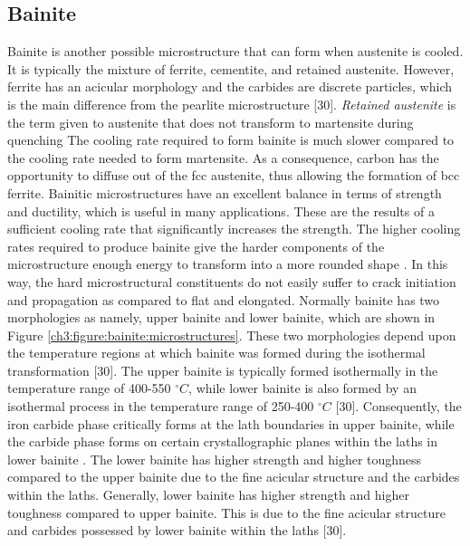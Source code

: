 \documentclass[12pt]{report}
\begin{document}
\subsection{Bainite}
Bainite is another possible microstructure that can form when austenite is cooled. It is typically the mixture of ferrite, cementite, and retained austenite. However, ferrite has an acicular morphology and the carbides are discrete particles, which is the main difference from the pearlite microstructure [30]. \emph{Retained austenite} is the term given to austenite that does not transform to martensite during quenching \cite{bajaj2020steels} The cooling rate required to form bainite is much slower compared to the cooling rate needed to form martensite. As a consequence, carbon has the opportunity to diffuse out of the fcc austenite, thus allowing the formation of bcc ferrite.  
Bainitic microstructures have an excellent balance in terms of strength and ductility, which is useful in many applications. These are the results of a sufficient cooling rate that significantly increases the strength. The higher cooling rates required to produce bainite give the harder components of the microstructure enough energy to transform into a more rounded shape \cite{bajaj2020steels}. In this way, the hard microstructural constituents do not easily suffer to crack initiation and propagation as compared to flat and elongated.
Normally bainite has two morphologies as namely, upper bainite and lower bainite, which are shown in Figure \ref{ch3:figure:bainite:microstructures}. These two morphologies depend upon the temperature regions at which bainite was formed during the isothermal transformation [30]. The upper bainite is typically formed isothermally in the temperature range of 400-550 $^\circ C$, while lower bainite is also formed by an isothermal process in the temperature range of 250-400 $^\circ C$ [30]. Consequently, the iron carbide phase critically forms at the lath boundaries in upper bainite, while the carbide phase forms on certain crystallographic planes within the laths in lower bainite \cite{bajaj2020steels}. The lower bainite has higher strength and higher toughness compared to the upper bainite due to the fine acicular structure and the carbides within the laths. Generally, lower bainite has higher strength and higher toughness compared to upper bainite. This is due to the fine acicular structure and carbides possessed by lower bainite within the laths [30].
     
\end{document}
